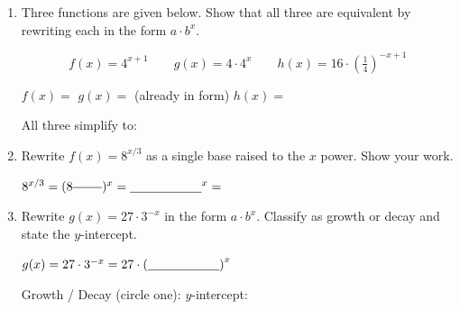 \documentclass[10pt]{article}
\begin{document}
\begin{tcolorbox}[colback=white, colframe=black!40,
    title=\textbf{Tier A --- Apply},
    fonttitle=\bfseries, arc=2mm, left=3mm, right=3mm, top=2mm, bottom=2mm]

\begin{enumerate}[itemsep=12pt]

  \item Three functions are given below. Show that all three are equivalent by rewriting each
        in the form $a \cdot b^x$.

        \[
          f(x) = 4^{x+1}
          \qquad
          g(x) = 4 \cdot 4^x
          \qquad
          h(x) = 16 \cdot \left(\tfrac{1}{4}\right)^{-x+1}
        \]

        $f(x) = $ \blank{5cm} \quad $g(x) = $ \blank{4cm} (already in form) \quad $h(x) = $ \blank{5cm}

        \vspace{0.04in}
        All three simplify to: \blank{5cm}

  \item Rewrite $f(x) = 8^{x/3}$ as a single base raised to the $x$ power. Show your work.

        \vspace{0.04in}
        $8^{x/3} = (8^{\blank{0.8cm}})^x = \blank{2cm}^x = $ \blank{3cm}

  \item Rewrite $g(x) = 27 \cdot 3^{-x}$ in the form $a \cdot b^x$. Classify as growth or decay
        and state the $y$-intercept.

        \vspace{0.04in}
        $g(x) = 27 \cdot 3^{-x} = 27 \cdot \left(\blank{2cm}\right)^x$

        \vspace{0.04in}
        Growth / Decay (circle one): \blank{2cm} \quad $y$-intercept: \blank{2cm}

\end{enumerate}
\end{tcolorbox}

\vspace{0.1in}
\end{document}

